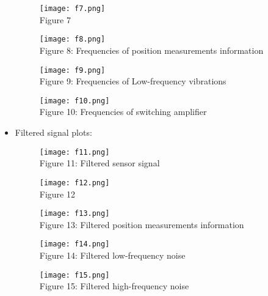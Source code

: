 \documentclass[12pt,a4paper]{article}
\begin{document}
\begin{itemize}
\begin{figure}[h]
    \centering
    \texttt{[image: f7.png]}
    \\Figure 7
\end{figure}
\clearpage

\begin{figure}[h]
    \centering
    \texttt{[image: f8.png]}
    \\Figure 8: Frequencies of position measurements information
\end{figure}

\begin{figure}[h]
    \centering
    \texttt{[image: f9.png]}
    \\Figure 9: Frequencies of Low-frequency vibrations
\end{figure}
\clearpage

\begin{figure}[h]
    \centering
    \texttt{[image: f10.png]}
    \\Figure 10: Frequencies of switching amplifier
\end{figure}

    \item
    Filtered signal plots:

\begin{figure}[h]
    \centering
    \texttt{[image: f11.png]}
    \\Figure 11: Filtered sensor signal
\end{figure}    
\clearpage

\begin{figure}[h]
    \centering
    \texttt{[image: f12.png]}
    \\Figure 12
\end{figure}

\begin{figure}[h]
    \centering
    \texttt{[image: f13.png]}
    \\Figure 13: Filtered position measurements information
\end{figure}  
\clearpage

\begin{figure}[h]
    \centering
    \texttt{[image: f14.png]}
    \\Figure 14: Filtered low-frequency noise 
\end{figure} 

\begin{figure}[h]
    \centering
    \texttt{[image: f15.png]}
    \\Figure 15: Filtered high-frequency noise
\end{figure}
\clearpage
\end{itemize}
\end{document}
